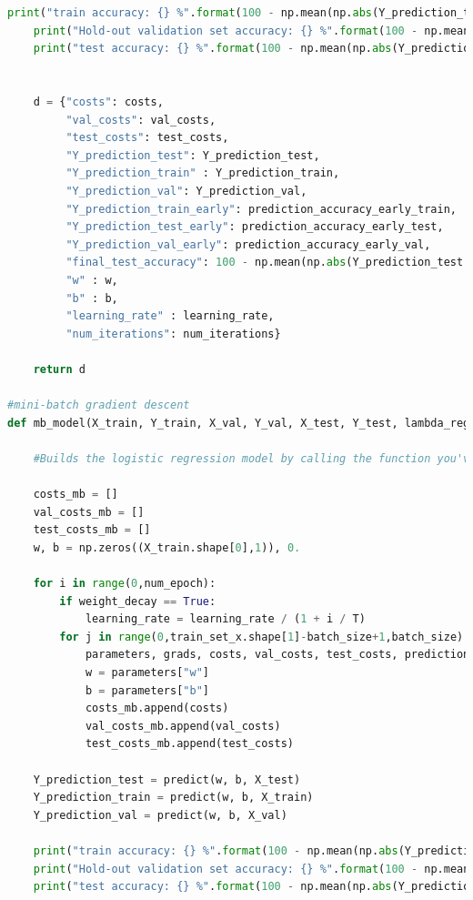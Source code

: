 \documentclass{article} %
\begin{document}
{\begin{lstlisting}[language=Python]
    print("train accuracy: {} %".format(100 - np.mean(np.abs(Y_prediction_train - Y_train)) * 100))
    print("Hold-out validation set accuracy: {} %".format(100 - np.mean(np.abs(Y_prediction_val - Y_val)) * 100))
    print("test accuracy: {} %".format(100 - np.mean(np.abs(Y_prediction_test - Y_test)) * 100))

    
    d = {"costs": costs,
         "val_costs": val_costs,
         "test_costs": test_costs,
         "Y_prediction_test": Y_prediction_test, 
         "Y_prediction_train" : Y_prediction_train, 
         "Y_prediction_val": Y_prediction_val,
         "Y_prediction_train_early": prediction_accuracy_early_train,
         "Y_prediction_test_early": prediction_accuracy_early_test,
         "Y_prediction_val_early": prediction_accuracy_early_val,
         "final_test_accuracy": 100 - np.mean(np.abs(Y_prediction_test - Y_test)) * 100,
         "w" : w, 
         "b" : b,
         "learning_rate" : learning_rate,
         "num_iterations": num_iterations}
    
    return d

#mini-batch gradient descent
def mb_model(X_train, Y_train, X_val, Y_val, X_test, Y_test, lambda_reg, reg_type, batch_size, num_epoch, learning_rate, T = 2, print_cost = True, weight_decay = False):

    #Builds the logistic regression model by calling the function you've implemented previously

    costs_mb = []
    val_costs_mb = []
    test_costs_mb = []
    w, b = np.zeros((X_train.shape[0],1)), 0.
    
    for i in range(0,num_epoch):
        if weight_decay == True:
            learning_rate = learning_rate / (1 + i / T)
        for j in range(0,train_set_x.shape[1]-batch_size+1,batch_size):
            parameters, grads, costs, val_costs, test_costs, prediction_accuracy_early_train, prediction_accuracy_early_val, prediction_accuracy_early_test = optimize(w, b, X_train, Y_train, X_val, Y_val, X_test, Y_test, lambda_reg, reg_type, 1, learning_rate, print_cost = True, early_stopping = False)
            w = parameters["w"]
            b = parameters["b"]
            costs_mb.append(costs)
            val_costs_mb.append(val_costs)
            test_costs_mb.append(test_costs)
    
    Y_prediction_test = predict(w, b, X_test)
    Y_prediction_train = predict(w, b, X_train)
    Y_prediction_val = predict(w, b, X_val)

    print("train accuracy: {} %".format(100 - np.mean(np.abs(Y_prediction_train - Y_train)) * 100))
    print("Hold-out validation set accuracy: {} %".format(100 - np.mean(np.abs(Y_prediction_val - Y_val)) * 100))
    print("test accuracy: {} %".format(100 - np.mean(np.abs(Y_prediction_test - Y_test)) * 100))


\end{lstlisting}}
\end{document}
